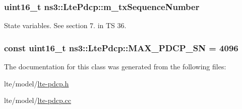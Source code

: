 \subsubsection[{\texorpdfstring{m\+\_\+tx\+Sequence\+Number}{m_txSequenceNumber}}]{\setlength{\rightskip}{0pt plus 5cm}uint16\+\_\+t ns3\+::\+Lte\+Pdcp\+::m\+\_\+tx\+Sequence\+Number\hspace{0.3cm}{\ttfamily [private]}}\hypertarget{classns3_1_1LtePdcp_a4f46368bfb47f0f95fe22dc92c740b4f}{}\label{classns3_1_1LtePdcp_a4f46368bfb47f0f95fe22dc92c740b4f}
State variables. See section 7. in TS 36. 
\subsubsection[{\texorpdfstring{M\+A\+X\+\_\+\+P\+D\+C\+P\+\_\+\+SN}{MAX_PDCP_SN}}]{\setlength{\rightskip}{0pt plus 5cm}const uint16\+\_\+t ns3\+::\+Lte\+Pdcp\+::\+M\+A\+X\+\_\+\+P\+D\+C\+P\+\_\+\+SN = 4096\hspace{0.3cm}{\ttfamily [static]}}\hypertarget{classns3_1_1LtePdcp_a327ef6a5d07120c39d9ee0acebc8b741}{}\label{classns3_1_1LtePdcp_a327ef6a5d07120c39d9ee0acebc8b741}


The documentation for this class was generated from the following files\+:\begin{DoxyCompactItemize}
\item 
lte/model/\hyperlink{lte-pdcp_8h}{lte-\/pdcp.\+h}\item 
lte/model/\hyperlink{lte-pdcp_8cc}{lte-\/pdcp.\+cc}\end{DoxyCompactItemize}
